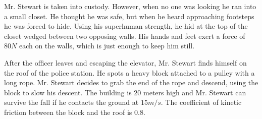 \begin{questions}
\question
Mr. Stewart is taken into custody. However, when no one was looking he ran into a small closet. He thought he was safe, but when he heard approaching footsteps he was forced to hide. Using his superhuman strength, he hid at the top of the closet wedged between two opposing walls. His hands and feet exert a force of $80N$ each on the walls, which is just enough to keep him still.

\begin{center}
\end{center}


\question
After the officer leaves and escaping the elevator, Mr. Stewart finds himself on the roof of the police station. He spots a heavy block attached to a pulley with a long rope. Mr. Stewart decides to grab the end of the rope and descend, using the block to slow his descent. The building is 20 meters high and Mr. Stewart can survive the fall if he contacts the ground at $15 m/s$. The coefficient of kinetic friction between the block and the roof is $0.8$.


\end{questions}
